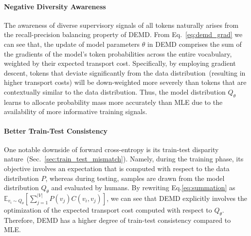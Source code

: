 \paragraph{Negative Diversity Awareness} The awareness of diverse supervisory signals of all tokens naturally arises from the recall-precision balancing property of DEMD. From Eq.~\ref{eq:demd_grad} we can see that, 
the update of model parameters $\theta$ in DEMD comprises the sum of the gradients of the model's token probabilities across the entire vocabulary, weighted by their expected transport cost. Specifically, by employing gradient descent, tokens that deviate significantly from the data distribution~(resulting in higher transport costs) will be down-weighted more severely than tokens that are contextually similar to the data distribution. Thus, the model distribution $Q_{\theta}$ learns to allocate probability mass more accurately than MLE due to the availability of more informative training signals.
\paragraph{Better Train-Test Consistency} One notable downside of forward cross-entropy is its train-test disparity nature~(Sec.~\ref{sec:train_test_mismatch}). 
Namely, during the training phase, its objective involves an expectation that is computed with respect to the data distribution $P$, whereas during testing, samples are drawn from the model distribution $Q_{\theta}$ and evaluated by humans. By rewriting Eq.\ref{eq:summation} as $\mathbb{E}_{v_i\sim Q_{\theta}}[\sum_{j=1}^{|V|}P(v_j)C(v_i,v_j)]$, we can see that DEMD explicitly involves the optimization of the expected transport cost computed with respect to $Q_{\theta}$. Therefore, DEMD has a higher degree of train-test consistency compared to MLE.
\label{sec:upperbound}
